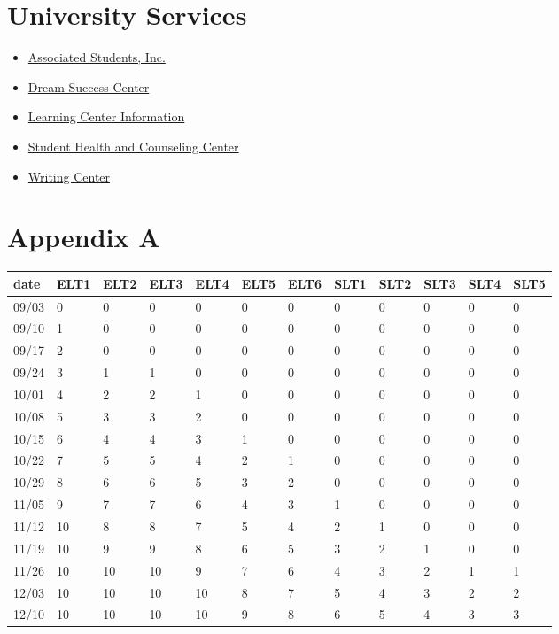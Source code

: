 \hypertarget{university-services}{%
\section{University Services}\label{university-services}}

\begin{itemize}
\tightlist
\item
  \href{http://fresnostateasi.org/}{Associated Students, Inc.}
\item
  \href{http://fresnostate.edu/studentaffairs/dsc/index.html}{Dream
  Success Center}
\item
  \href{http://fresnostate.edu/studentaffairs/lrc}{Learning Center
  Information}
\item
  \href{https://www.fresnostate.edu/studentaffairs/health/}{Student
  Health and Counseling Center}
\item
  \href{http://www.fresnostate.edu/artshum/writingcenter/}{Writing
  Center}
\end{itemize}

\hypertarget{lta-cost}{%
\section{Appendix A}\label{lta-cost}}

\begin{longtable}[]{@{}llllllllllll@{}}
\toprule
date & ELT1 & ELT2 & ELT3 & ELT4 & ELT5 & ELT6 & SLT1 & SLT2 & SLT3 &
SLT4 & SLT5\tabularnewline
\midrule
\endhead
09/03 & 0 & 0 & 0 & 0 & 0 & 0 & 0 & 0 & 0 & 0 & 0\tabularnewline
09/10 & 1 & 0 & 0 & 0 & 0 & 0 & 0 & 0 & 0 & 0 & 0\tabularnewline
09/17 & 2 & 0 & 0 & 0 & 0 & 0 & 0 & 0 & 0 & 0 & 0\tabularnewline
09/24 & 3 & 1 & 1 & 0 & 0 & 0 & 0 & 0 & 0 & 0 & 0\tabularnewline
10/01 & 4 & 2 & 2 & 1 & 0 & 0 & 0 & 0 & 0 & 0 & 0\tabularnewline
10/08 & 5 & 3 & 3 & 2 & 0 & 0 & 0 & 0 & 0 & 0 & 0\tabularnewline
10/15 & 6 & 4 & 4 & 3 & 1 & 0 & 0 & 0 & 0 & 0 & 0\tabularnewline
10/22 & 7 & 5 & 5 & 4 & 2 & 1 & 0 & 0 & 0 & 0 & 0\tabularnewline
10/29 & 8 & 6 & 6 & 5 & 3 & 2 & 0 & 0 & 0 & 0 & 0\tabularnewline
11/05 & 9 & 7 & 7 & 6 & 4 & 3 & 1 & 0 & 0 & 0 & 0\tabularnewline
11/12 & 10 & 8 & 8 & 7 & 5 & 4 & 2 & 1 & 0 & 0 & 0\tabularnewline
11/19 & 10 & 9 & 9 & 8 & 6 & 5 & 3 & 2 & 1 & 0 & 0\tabularnewline
11/26 & 10 & 10 & 10 & 9 & 7 & 6 & 4 & 3 & 2 & 1 & 1\tabularnewline
12/03 & 10 & 10 & 10 & 10 & 8 & 7 & 5 & 4 & 3 & 2 & 2\tabularnewline
12/10 & 10 & 10 & 10 & 10 & 9 & 8 & 6 & 5 & 4 & 3 & 3\tabularnewline
\bottomrule
\end{longtable}
